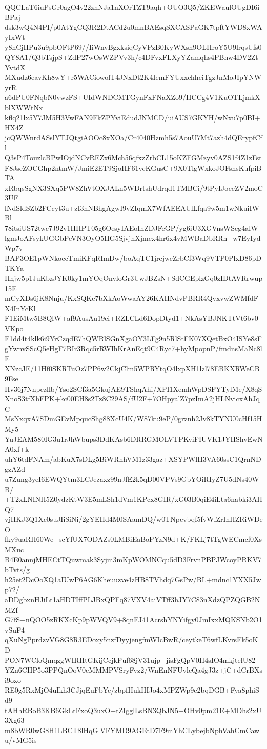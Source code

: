 QQCLaT6iuPsGr0agO4v22zhNJa1nXOrTZT9aqh+OUO3Q5/ZKEWaulOUgDI6iBPaj
dsk3wQ4N4PI/p0AtYgCQ3R2DtACd2u0mnBAEsqSXCASPaGK7tpftYWD8xWAyIxWt
y8nCjHPu3u9pbOFtP69//IiWnvBgxksiqCyVPzB0KyWXsh9OLHroY5U9lrqsUfs0
QY8A1/Q3bTsjpS+ZdP27wOsWZPVv3h/c4DFvxFLXyYZamqhs4PBnw4DV2ZtYvtdX
MXudz6eavKh8wY+r5WACiowolT4JNxDt2K4IemFYUxxchheiTgzJnMoJIpYNWyrR
a6dPU0FNqbN0vwzFS+UIdWNDCMTGynFxFNaXZo9/HCCg4V1KuOTLjmkXblXWWtNx
kflq21lx5Y7JM5H3VwFAN9FkZPYviEdudJNMCD/uiAUS7GKYH/wNxu7p0BI+HX4Z
jcQWWnrdASslYTJQtgiAOOc8xXOa/Cr4040Hzmh5s7AouU7Mt7azh4dQErypfCfl
Q3sP4TouzlcBPwIOjdNCvREZx6Mch56qfxzZrbCL15oKZFGMzyv0AZS1f4Z1zFst
F8JscZOCGhp2ntmW/JmiE2ET9SjoHF61vcKGusC+9X0TlgWxkoJOFsnsKufpiBTA
xRbqsSgNX3SXq5PW8ZhVtOXJALn5WDrtshUdrqd1TMBCi/9tPyIJoeeZV2moC3UF
lNdSldSZb2FCcyt3u+zI3nNBhgAgwI9vZIqmX7WfAEEAUlLfqa9w5m1wNkuiIWBl
78itsiUS72twc7J92v1HHPT05g6OesyIAEoIhZDJFeGP/yg6iU3XGVnsWSeg4alW
lgmJoAFsykUGGbPeVN3OyO5HG5SjvjhXjmex4hr6x4vMWBaDbRRn+w7EyIydWp7v
BAP3OE1pWNkoecTmiKFqRImDw/boAqTC1jrejweZrbCf3Wq9VTP0PlxD86pDTKYa
Hhjw5p1JuKbzJYK0ky1mYOqOnvloGr3UwJBZsN+SdCGEplzGq0zIDtAVRrwup15E
mCyXDs6jK8Nnju/KxSQKe7bXkAoWwaAY26KAHNdvPBRR4QvxvwZWMfdFX4InYcKl
F1EiMtw5B8QlW+af9AusAu19ei+RZLCLd6DopDtyd1+NkAsYBJNKTtVt6bv0VKpo
F1dd4t4klk6i9YrCzqdE7hQWRlSGnXgaOY3LFg9n5RlStFK07XQetBxO4ISYe8sF
gYwnvSScQ5eHgF7BIr3Rqc5rRWIhKrAnEqt9C4Ryc7+byMpopnP/fmdnsMaNc8lE
XNzcJE/11Hf0SKRTuOz7PP6w2CkjClm5WPRYtqO4lxpXH1lzl78EBKXRWeCB9Fse
Hv36j7Nnpezllb/Yso2SCf3a5GkujAE9TShqAhi/XPI1XemhWpDSFYTylMe/X8qS
XnoS3tfXhFPK+kc00EH8s2Tz8C29AS/fU2F+7OHpyalZ7pzImA2jHLNvicxAhJqC
MsNxqxA7SDmGEvMpqucShg88XcU4K/W87ku9eP/0grznh2Jv8kTYNU0cHf15HMy5
YuJEAM580IG3u1rJhWbups3DdKAsb6DRRGMOLVTPKviFIUVK1JYHShvEwNA0xf+k
uhY6tdFNAm/abKuX7sDLg5BiWRnhVM1z33gaz+XSYPWlH3VA60ssC1QrnNDgzAZd
u7Zung3yeI6EWQYtm3LCJezaxz99nJfE2k5qD00VPVs9GbYOiRIyZ7U5dNs40WB/
+T2xLNINH5Z0ydzKtW3E5mLSh1dVm1KPcx8GIR/xG03B0qiE4iLta6nabki3AHQ7
vjHKJ3Q1Xc0suJIiSiNi/2gYEHd4M0SAamDQ/w0TNpcvbqf5fvWlZrInHZRiWDeO
fky9uaRH60We+scYfUX7ODAZs0LMBiEaBoPYzN9d+K/FKLj7tTgWECmcf0XsMXuc
B4E0annjMHECtTQuwmak3Syjm3mKpWOMNCqu5dD3FrvnPBPJWcoyPRKV7bTvts/g
h25et2DcOoXQ1aIUwP6AG6Kheuuzve4zHB8TVhdq7GsPw/BL+mdnc1YXX5Jwp72/
aDDgbxnHJiLt1aHDTIffPLJBxQPFq87VXV4aiVTff3hJY7C83nXdzQPZQGB2NMZf
G7fS+nQOO5zRKXcKp9pWVQV9+8qnFJ41AcrshYNYifgy0JmIxxMQKSNb2O1vSuF4
qXuNgPprdzvVG8G8R3EDoxy5nzfDyyjengfmWIcBwR/ceytkeT6wfLKvrsFk5oKD
PON7WCloQmqzgWIRHtGKijCcjkPuf68jV31ujp+jisFgQpV0H4sIO4mkjtelU82+
YZn6CHP5o3PPQnOoV0cMMMPVSryFvz2/WnEnNFUvlcQa4gJ3z+jC+dCrBXsi9oxo
RE0g5RxMjO4uIkh3CJjqEuFbYc/zbpfHukHIJo4xMPZWp9c2bqDGB+Fya8phiSd9
tAHhRBoB3KB6GkLtFxoQ3uxO+tZIgglLsBN3QbJN5+OHv0pm21E+MDhs2xU3Xg63
m8bWR0wG8H1LBCT8lHqGlVFYMD9AGEtD7F9mYhCLybejbNphVahCmCawu/vMG5is
